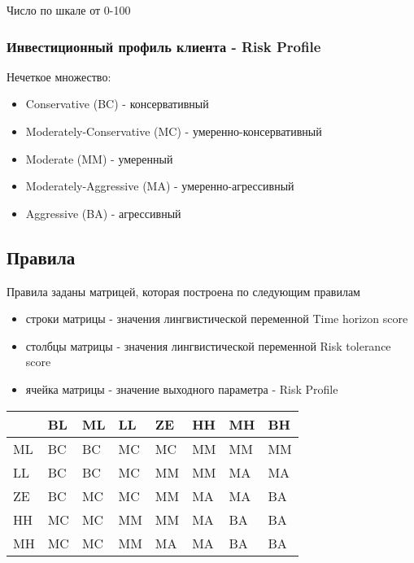 \documentclass[11pt]{article}
\providecommand{\tightlist}{%
      \setlength{\itemsep}{0pt}\setlength{\parskip}{0pt}}
\begin{document}
Число по шкале от 0-100

\subsubsection{Инвестиционный профиль клиента - Risk
Profile}\label{ux438ux43dux432ux435ux441ux442ux438ux446ux438ux43eux43dux43dux44bux439-ux43fux440ux43eux444ux438ux43bux44c-ux43aux43bux438ux435ux43dux442ux430---risk-profile}

Нечеткое множество:

\begin{itemize}
\tightlist
\item
  Conservative (BC) - консервативный
\item
  Moderately-Conservative (MC) - умеренно-консервативный
\item
  Moderate (MM) - умеренный
\item
  Moderately-Aggressive (MA) - умеренно-агрессивный
\item
  Aggressive (BA) - агрессивный
\end{itemize}

\subsection{Правила}\label{ux43fux440ux430ux432ux438ux43bux430}

Правила заданы матрицей, которая построена по следующим правилам

\begin{itemize}
\tightlist
\item
  строки матрицы - значения лингвистической переменной Time horizon
  score
\item
  столбцы матрицы - значения лингвистической переменной Risk tolerance
  score
\item
  ячейка матрицы - значение выходного параметра - Risk Profile
\end{itemize}

\begin{longtable}[]{@{}llllllll@{}}
\toprule\noalign{}
& BL & ML & LL & ZE & HH & MH & BH \\
\midrule\noalign{}
\endhead
\bottomrule\noalign{}
\endlastfoot
ML & BC & BC & MC & MC & MM & MM & MM \\
LL & BC & BC & MC & MM & MM & MA & MA \\
ZE & BC & MC & MC & MM & MA & MA & BA \\
HH & MC & MC & MM & MM & MA & BA & BA \\
MH & MC & MC & MM & MA & MA & BA & BA \\
\end{longtable}
\end{document}

